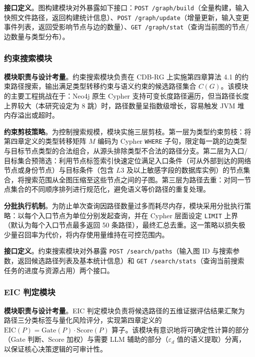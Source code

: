 \documentclass[a4paper,12pt]{ctexart}
\begin{document}
\textbf{接口定义}。图构建模块对外暴露如下接口：\texttt{POST /graph/build}（全量构建，输入快照文件路径，返回构建统计信息）、\texttt{POST /graph/update}（增量更新，输入变更事件列表，返回受影响节点与边的数量）、\texttt{GET /graph/stat}（查询当前图的节点/边数量与类型分布）。

\subsubsection{约束搜索模块}

\textbf{模块职责与设计考量}。约束搜索模块负责在 CDB-RG 上实施第四章算法 4.1 的约束路径搜索，输出满足类型转移约束与语义约束的候选路径集合 $C(G)$。该模块的主要工程挑战在于：Neo4j 原生 Cypher 支持可变长度路径遍历，但当路径长度上界较大（本研究设定为 8 跳）时，路径数量呈指数级增长，容易触发 JVM 堆内存溢出或超时。

\textbf{约束剪枝策略}。为控制搜索规模，模块实施三层剪枝。第一层为类型约束剪枝：将第四章定义的类型转移矩阵 $M$ 编码为 Cypher \texttt{WHERE} 子句，限定每一跳的边类型与目标节点类型的合法组合，从源头排除类型不合法的路径分支。第二层为入口/目标集合预筛选：利用节点标签索引快速定位满足入口条件（可从外部到达的网络节点或身份节点）与目标条件（包含 $L3$ 及以上敏感字段的数据库实例）的节点集合，将搜索范围从全图压缩至这些节点之间的子图。第三层为路径去重：对同一节点集合的不同顺序排列进行规范化，避免语义等价路径的重复处理。

\textbf{分批执行机制}。为防止单次查询因路径数量过多而耗尽内存，模块采用分批执行策略：以每个入口节点为单位分别发起查询，并在 Cypher 层面设定 \texttt{LIMIT} 上界（默认为每个入口节点最多返回 50 条路径），最终汇总去重。这一策略以损失极少量召回率为代价，将内存使用量维持在可控范围内。

\textbf{接口定义}。约束搜索模块对外暴露 \texttt{POST /search/paths}（输入图 ID 与搜索参数，返回候选路径列表及基本统计信息）和 \texttt{GET /search/stats}（查询当前搜索任务的进度与资源占用）两个接口。

\subsubsection{EIC 判定模块}

\textbf{模块职责与设计考量}。EIC 判定模块负责将候选路径的五维证据评估结果汇聚为路径三分类标签与量化风险评分，实现第四章定义的 $\mathrm{EIC}(P) = \mathrm{Gate}(P) \cdot \mathrm{Score}(P)$ 算子。该模块有意识地将可确定性计算的部分（Gate 判断、Score 加权）与需要 LLM 辅助的部分（$\varepsilon_d$ 值的语义提取）分离，以保证核心决策逻辑的可审计性。
\end{document}
